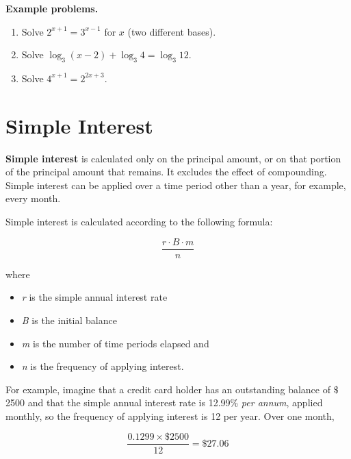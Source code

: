 \textbf{Example problems.}
\begin{enumerate}
    \item Solve $2^{x+1}=3^{x-1}$ for $x$ (two different bases).
    \item Solve $\log_3(x-2)+\log_3 4=\log_3 12$.
    \item Solve $4^{x+1}=2^{2x+3}$.
\end{enumerate}



\section{Simple Interest}
\label{sec:simp-d1c6}


\textbf{Simple interest} is calculated only on the principal amount, or on that portion of the principal amount that remains. It excludes the effect of compounding. Simple interest can be applied over a time period other than a year, for example, every month.



Simple interest is calculated according to the following formula:



$$\frac {r \cdot B \cdot m}{n}$$



where



\begin{itemize}
    \item \textit{r} is the simple annual interest rate
    \item \textit{B} is the initial balance
    \item \textit{m} is the number of time periods elapsed and
    \item \textit{n} is the frequency of applying interest.
\end{itemize}

For example, imagine that a credit card holder has an outstanding balance of
$\text{\$}$2500 and that the simple annual interest rate is 12.99\% \textit{per annum},
applied monthly, so the frequency of applying interest is 12 per year. Over one month,



$$\frac{0.1299 \times \$2500}{12} = \$27.06$$



